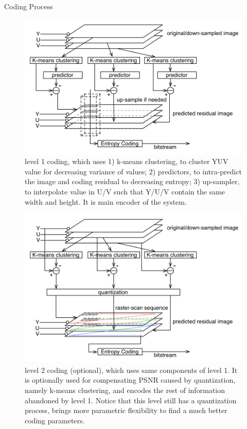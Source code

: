 \documentclass[12pt]{article}
\makeatletter
\renewenvironment{itemize}
{\list{$\bullet$}{\leftmargin\z@ \labelwidth\z@ \itemindent-\leftmargin
\let\makelabel\descriptionlabel}}
{\endlist}
\makeatother
\begin{document}
\begin{itemize}
	\item Coding Process
	\vspace{-1em}
	\begin{figure}
		\vspace{-3em}
		\includegraphics[scale=.35]{./res/codingProcessLevel1.png}
		\caption{level 1 coding, which uses 1) k-means clustering, to cluster YUV value for decreasing variance of values; 2) predictors, to intra-predict the image and coding residual to decreasing entropy; 3) up-sampler, to interpolate value in U/V such that Y/U/V contain the same width and height. It is main encoder of the system.}
	\end{figure}
	\vspace*{-0em}
	\begin{figure}
		\includegraphics[scale=.35]{./res/codingProcessLevel2.png}
		\caption{level 2 coding (optional), which uses same components of level 1. It is optionally used for compensating PSNR caused by quantization, namely k-means clustering, and encodes the rest of information abandoned by level 1. Notice that this level still has a quantization process, brings more parametric flexibility to find a much better coding parameters.}
	\end{figure}
	

\end{itemize}
\end{document}
